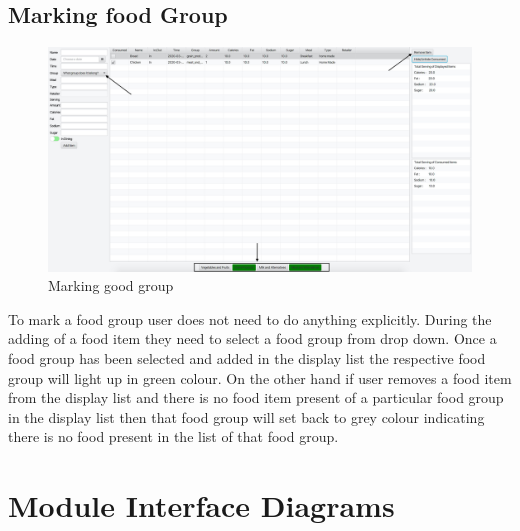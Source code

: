 \documentclass{scrreprt}
\begin{document}
\pagebreak

\subsection{Marking food Group}

\begin{figure}[!htbp]
\centering
\includegraphics[width=15cm]{pictures/food-group.png}
\caption*{Marking good group}
\end{figure}

\FloatBarrier

To mark a food group user does not need to do anything explicitly. During the adding of a food item they need to select a food group from drop down. Once a food group has been selected and added in the display list the respective food group will light up in green colour. On the other hand if user removes a food item from the display list and there is no food item present of a particular food group in the display list then that food group will set back to grey colour indicating there is no food present in the list of that food group.

\section{Module Interface Diagrams}

\begin{center}
\end{center}
\end{document}
